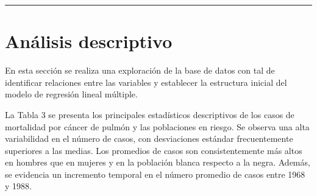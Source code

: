 \documentclass[
  12pt,
]{article}
\begin{document}
\begin{center}\rule{0.5\linewidth}{0.5pt}\end{center}

\section{Análisis descriptivo}\label{AnalisisDescriptivo}

En esta sección se realiza una exploración de la base de datos con tal
de identificar relaciones entre las variables y establecer la estructura
inicial del modelo de regresión lineal múltiple.

La Tabla 3 se presenta los principales estadísticos descriptivos de los
casos de mortalidad por cáncer de pulmón y las poblaciones en riesgo. Se
observa una alta variabilidad en el número de casos, con desviaciones
estándar frecuentemente superiores a las medias. Los promedios de casos
son consistentemente más altos en hombres que en mujeres y en la
población blanca respecto a la negra. Además, se evidencia un incremento
temporal en el número promedio de casos entre 1968 y 1988.

\begingroup\fontsize{9}{11}\selectfont
\end{document}
